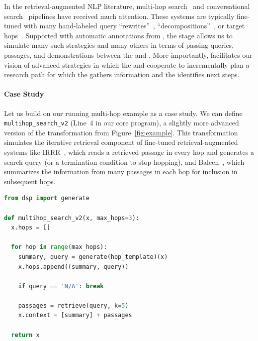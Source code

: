 In the retrieval-augmented NLP literature, multi-hop search~\cite{xiong2020answering,khattab2021baleen} and conversational search~\cite{del2021question,raposo2022question} pipelines have received much attention. These systems are typically fine-tuned with many hand-labeled query ``rewrites''~\cite{anantha2020open}, ``decompositions''~\cite{geva2021did,min2019multi}, or target hops~\cite{yang2018hotpotqa,jiang2020hover}. %
Supported with automatic annotations from \demonstrate, the \search stage allows us to simulate many such strategies and many others
in terms of passing queries, passages, and demonstrations between the \RM{} and \LM{}. More importantly, \search facilitates our vision of advanced strategies in which the \LM{} and \RM{} cooperate to incrementally plan a research path for which the \RM{} gathers information and the \LM{} identifies next steps.

\paragraph{Case Study} Let us build on our running multi-hop example as a case study. We can define \texttt{multihop\_search\_v2} (Line~4 in our core program), a slightly more advanced version of the \search transformation from Figure~\ref{fig:example}. This transformation simulates the iterative retrieval component of fine-tuned retrieval-augmented systems like IRRR~\cite{qi2020retrieve}, which reads a retrieved passage in every hop and generates a search query (or a termination condition to stop hopping), and Baleen~\cite{khattab2021baleen}, which summarizes the information from many passages in each hop for inclusion in subsequent hops.

\begin{samepage}

\begin{lstlisting}[language=Python]
from dsp import generate

def multihop_search_v2(x, max_hops=3):
  x.hops = []
  
  for hop in range(max_hops):
    summary, query = generate(hop_template)(x)
    x.hops.append((summary, query))
    
    if query == 'N/A': break
    
    passages = retrieve(query, k=5)
    x.context = [summary] + passages
    
  return x
\end{lstlisting}
\end{samepage}




